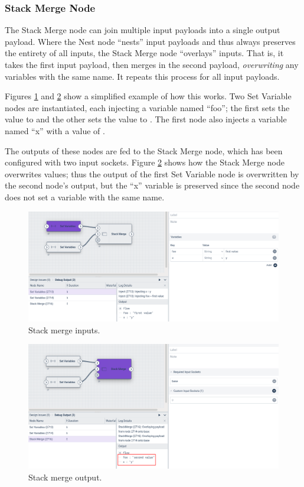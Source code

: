 \subsubsection{Stack Merge Node}
The Stack Merge node can join multiple input payloads into a single output payload. Where the Nest node ``nests'' input payloads and thus always preserves the entirety of all inputs, the Stack Merge node ``overlays'' inputs. That is, it takes the first input payload, then merges in the second payload, \emph{overwriting} any variables with the same name. It repeats this process for all input payloads.

Figures \ref{fig:stackmerge1} and \ref{fig:stackmerge2} show a simplified example of how this works. Two Set Variable nodes are instantiated, each injecting a variable named ``foo''; the first sets the value to  and the other sets the value to . The first node also injects a variable named ``x'' with a value of .

The outputs of these nodes are fed to the Stack Merge node, which has been configured with two input sockets. Figure \ref{fig:stackmerge2} shows how the Stack Merge node overwrites values; thus the  output of the first Set Variable node is overwritten by the second node's  output, but the ``x'' variable is preserved since the second node does not set a variable with the same name.

\begin{figure}
	\includegraphics[width=0.85\linewidth]{images/stackmerge1.png}
	\caption{Stack merge inputs.}
	\label{fig:stackmerge1}
\end{figure}

\begin{figure}
	\includegraphics[width=0.85\linewidth]{images/stackmerge2.png}
	\caption{Stack merge output.}
	\label{fig:stackmerge2}
\end{figure}


